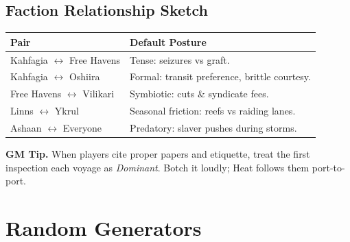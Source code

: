 \documentclass[11pt,oneside]{book}
\begin{document}
\begin{itemize}
\section*{Faction Relationship Sketch}
\begin{tabularx}{\linewidth}{@{}p{3.0cm} X@{}}
\toprule
\textbf{Pair} & \textbf{Default Posture}\\
\midrule
Kahfagia \(\leftrightarrow\) Free Havens & Tense: seizures vs graft.\\
Kahfagia \(\leftrightarrow\) Oshiira & Formal: transit preference, brittle courtesy.\\
Free Havens \(\leftrightarrow\) Vilikari & Symbiotic: cuts \& syndicate fees.\\
Linns \(\leftrightarrow\) Ykrul & Seasonal friction: reefs vs raiding lanes.\\
Ashaan \(\leftrightarrow\) Everyone & Predatory: slaver pushes during storms.\\
\bottomrule
\end{tabularx}

\begin{tcolorbox}[breakable]
\textbf{GM Tip.} When players cite proper papers and etiquette, treat the first inspection each voyage as \emph{Dominant}. Botch it loudly; Heat follows them port-to-port.
\end{tcolorbox}

\chapter{Random Generators}


\end{itemize}
\end{document}

